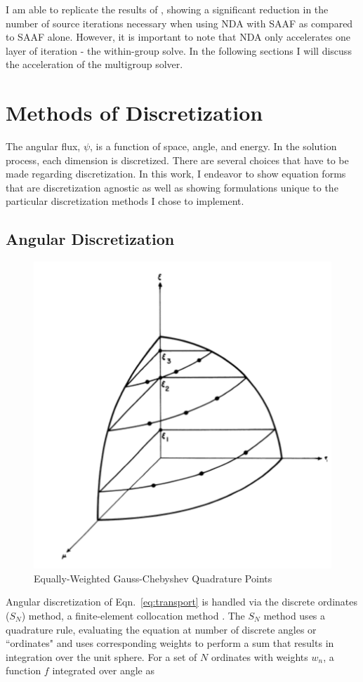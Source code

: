 I am able to replicate the results of \cite{Wang2013}, showing a significant reduction in the number of source iterations necessary when using NDA with SAAF as compared to SAAF alone. However, it is important to note that NDA only accelerates one layer of iteration - the within-group solve. In the following sections I will discuss the acceleration of the multigroup solver.


\section{Methods of Discretization}
The angular flux, $\psi$, is a function of space, angle, and energy. In the solution process, each dimension is discretized. There are several choices that have to be made regarding discretization. In this work, I endeavor to show equation forms that are discretization agnostic as well as showing formulations unique to the particular discretization methods I chose to implement. 

\subsection{Angular Discretization}
 
\begin{figure}[H]
    \centering
    \includegraphics[width=.5\textwidth]{fig/SNPoints.png}
    \caption{Equally-Weighted Gauss-Chebyshev Quadrature Points \cite{Lathrop1965}}
    \label{fig:SN}
\end{figure}
%
Angular discretization of Eqn.~\eqref{eq:transport} is handled via the discrete ordinates ($S_N$) method, a finite-element collocation method \cite{Lathrop1965}. The $S_N$ method uses a quadrature rule, evaluating the equation at number of discrete angles or ``ordinates" and uses corresponding weights to perform a sum that results in integration over the unit sphere. 
For a set of $N$ ordinates with weights $w_n$, a function $f$ integrated over angle as

